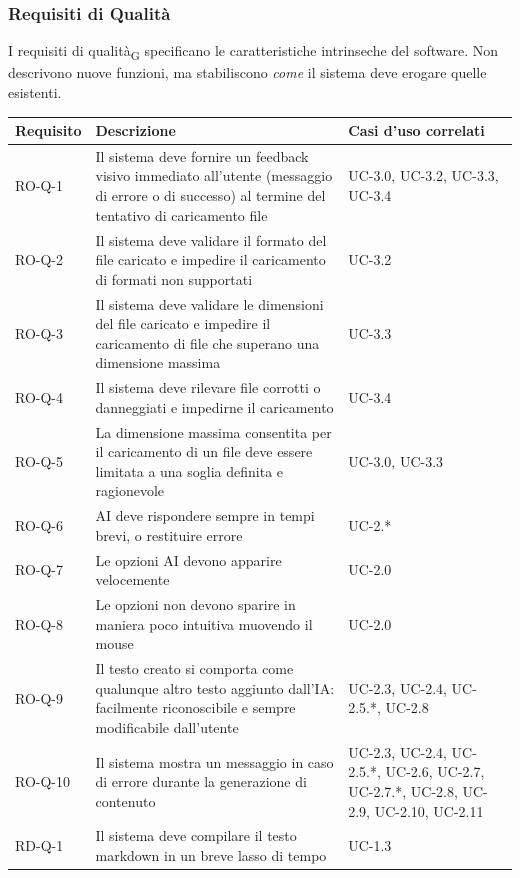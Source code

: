 \documentclass[11pt,a4paper]{article}
\begin{document}
\subsubsection{Requisiti di Qualità}
I requisiti di qualità\textsubscript{G} specificano le caratteristiche intrinseche del software. Non descrivono nuove funzioni, ma stabiliscono \textit{come} il sistema deve erogare quelle esistenti. 
\begin{table}[H]
\centering
\begin{tabular}{|p{}|>{\raggedright\arraybackslash}p{}|p{}|}
\hline
\textbf{Requisito} & \textbf{Descrizione} & \textbf{Casi d'uso correlati}\\
\hline
RO-Q-1 & Il sistema deve fornire un feedback visivo immediato all'utente (messaggio di errore o di successo) al termine del tentativo di caricamento file & UC-3.0, UC-3.2, UC-3.3, UC-3.4 \\
\hline
RO-Q-2 & Il sistema deve validare il formato del file caricato e impedire il caricamento di formati non supportati & UC-3.2 \\
\hline
RO-Q-3 & Il sistema deve validare le dimensioni del file caricato e impedire il caricamento di file che superano una dimensione massima & UC-3.3 \\
\hline
RO-Q-4 & Il sistema deve rilevare file corrotti o danneggiati e impedirne il caricamento & UC-3.4 \\
\hline
RO-Q-5 & La dimensione massima consentita per il caricamento di un file deve essere limitata a una soglia definita e ragionevole & UC-3.0, UC-3.3 \\
\hline
RO-Q-6 & AI deve rispondere sempre in tempi brevi, o restituire errore & UC-2.* \\
\hline
RO-Q-7 & Le opzioni AI devono apparire velocemente & UC-2.0 \\
\hline
RO-Q-8 & Le opzioni non devono sparire in maniera poco intuitiva muovendo il mouse & UC-2.0 \\
\hline
RO-Q-9 & Il testo creato si comporta come qualunque altro testo aggiunto dall'IA: facilmente riconoscibile e sempre modificabile dall'utente & UC-2.3, UC-2.4, UC-2.5.*, UC-2.8 \\
\hline
RO-Q-10 & Il sistema mostra un messaggio in caso di errore durante la generazione di contenuto & UC-2.3, UC-2.4, UC-2.5.*, UC-2.6, UC-2.7, UC-2.7.*, UC-2.8, UC-2.9, UC-2.10, UC-2.11 \\
\hline
RD-Q-1 & Il sistema deve compilare il testo markdown in un breve lasso di tempo & UC-1.3 \\

\end{tabular}
\end{table}
\end{document}
